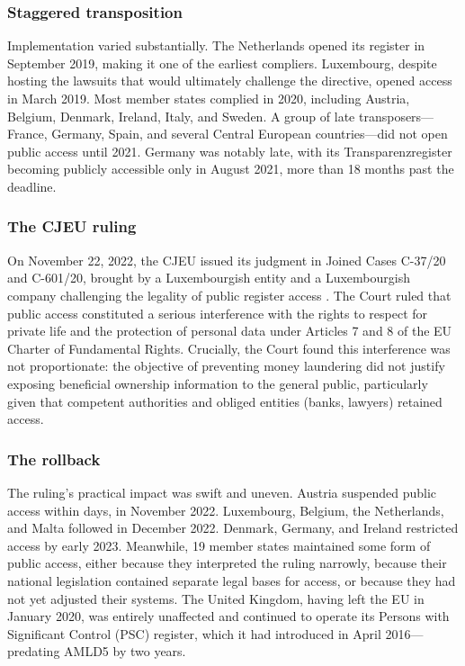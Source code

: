 \documentclass[12pt]{article}
\begin{document}
\subsubsection*{Staggered transposition} Implementation varied substantially. The Netherlands opened its register in September 2019, making it one of the earliest compliers. Luxembourg, despite hosting the lawsuits that would ultimately challenge the directive, opened access in March 2019. Most member states complied in 2020, including Austria, Belgium, Denmark, Ireland, Italy, and Sweden. A group of late transposers---France, Germany, Spain, and several Central European countries---did not open public access until 2021. Germany was notably late, with its Transparenzregister becoming publicly accessible only in August 2021, more than 18 months past the deadline.

\subsubsection*{The CJEU ruling} On November 22, 2022, the CJEU issued its judgment in Joined Cases C-37/20 and C-601/20, brought by a Luxembourgish entity and a Luxembourgish company challenging the legality of public register access \citep{cjeu2022wm}. The Court ruled that public access constituted a serious interference with the rights to respect for private life and the protection of personal data under Articles 7 and 8 of the EU Charter of Fundamental Rights. Crucially, the Court found this interference was not proportionate: the objective of preventing money laundering did not justify exposing beneficial ownership information to the general public, particularly given that competent authorities and obliged entities (banks, lawyers) retained access.

\subsubsection*{The rollback} The ruling's practical impact was swift and uneven. Austria suspended public access within days, in November 2022. Luxembourg, Belgium, the Netherlands, and Malta followed in December 2022. Denmark, Germany, and Ireland restricted access by early 2023. Meanwhile, 19 member states maintained some form of public access, either because they interpreted the ruling narrowly, because their national legislation contained separate legal bases for access, or because they had not yet adjusted their systems. The United Kingdom, having left the EU in January 2020, was entirely unaffected and continued to operate its Persons with Significant Control (PSC) register, which it had introduced in April 2016---predating AMLD5 by two years.
\end{document}
